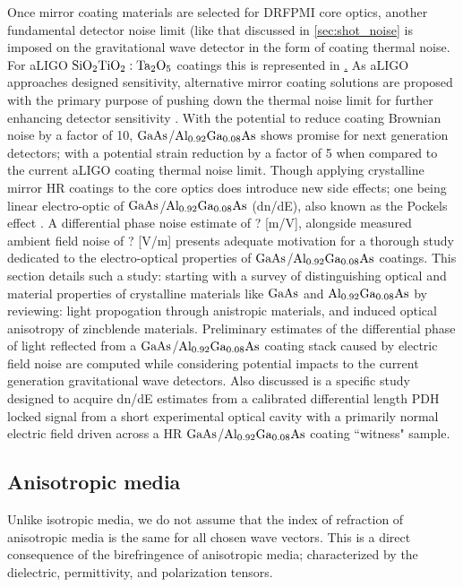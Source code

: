 
Once mirror coating materials are selected for DRFPMI core optics, another fundamental detector noise limit (like that discussed in \ref{sec:shot_noise} is imposed on the gravitational wave detector in the form of coating thermal noise. For aLIGO $\mathrm{SiO_2}\mathrm{TiO_2:Ta_2O_5}$ coatings this is represented in \hyperref[sec:ligo_noise]. As aLIGO approaches designed sensitivity, alternative mirror coating solutions are proposed with the primary purpose of pushing down the thermal noise limit for further enhancing detector sensitivity \cite{?}. With the potential to reduce coating Brownian noise by a factor of 10, $\mathrm{GaAs}$/$\mathrm{Al_{0.92}Ga_{0.08}As}$ shows promise for next generation detectors; with a potential strain reduction by a factor of 5 \cite{Cole:2013} when compared to the current aLIGO coating thermal noise limit. Though applying crystalline mirror HR coatings to the core optics does introduce new side effects; one being linear electro-optic of $\mathrm{GaAs}$/$\mathrm{Al_{0.92}Ga_{0.08}As}$ (dn/dE), also known as the Pockels effect \cite{abernathyposter}. A differential phase noise estimate of ? [m/V], alongside measured ambient field noise of ? [V/m] presents adequate motivation for a thorough study dedicated to the electro-optical properties of $\mathrm{GaAs}$/$\mathrm{Al_{0.92}Ga_{0.08}As}$ coatings. This section details such a study: starting with a survey of distinguishing optical and material properties of crystalline materials like $\mathrm{GaAs}$ and $\mathrm{Al_{0.92}Ga_{0.08}As}$ by reviewing: light propogation through anistropic materials, and induced optical anisotropy of zincblende materials. Preliminary estimates of the differential phase of light reflected from a $\mathrm{GaAs}$/$\mathrm{Al_{0.92}Ga_{0.08}As}$ coating stack caused by electric field noise are computed while considering potential impacts to the current generation gravitational wave detectors. Also discussed is a specific study designed to acquire dn/dE estimates from a calibrated differential length PDH locked signal from a short experimental optical cavity with a primarily normal electric field driven across a HR $\mathrm{GaAs}$/$\mathrm{Al_{0.92}Ga_{0.08}As}$ coating ``witness" sample.

\subsection{Anisotropic media}
Unlike isotropic media, we do not assume that the index of refraction of anisotropic media is the same for all chosen wave vectors. This is a direct consequence of the birefringence of anisotropic media; characterized by the dielectric, permittivity, and polarization tensors.

